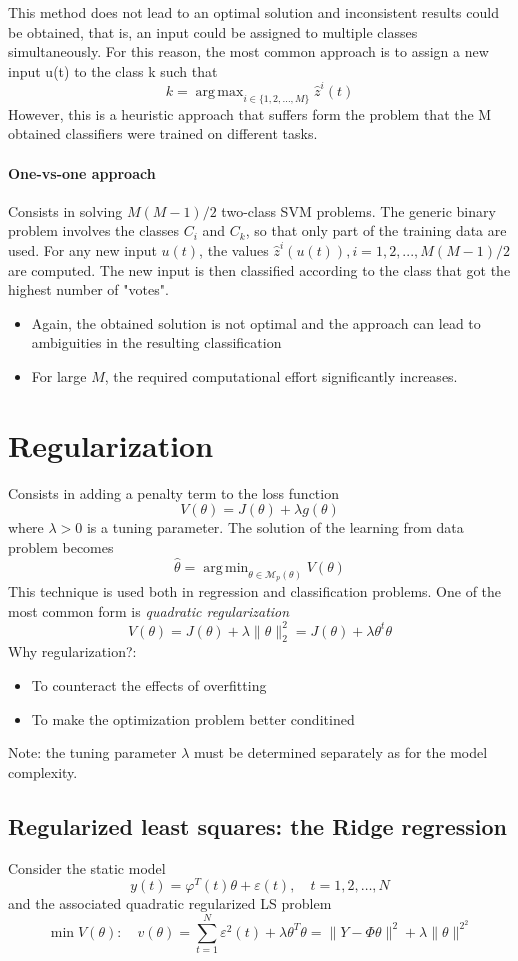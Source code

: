 \documentclass{book}
\DeclareMathOperator*{\argmax}{arg\,max}
\DeclareMathOperator*{\argmin}{arg\,min}
\begin{document}
This method does not lead to an optimal solution and inconsistent results could be obtained, that is, an input could be assigned to multiple classes simultaneously. For this reason, the most common approach is to assign a new input u(t) to the class k such that 
\[
  k=\argmax_{i\in\{1,2,\dots,M\}}\hat{z}^i(t)
\]
However, this is a heuristic approach that suffers form the problem that the M obtained classifiers were trained on different tasks.
\subsubsection{One-vs-one approach}
Consists in solving $M(M - 1)/2$ two-class SVM problems.
The generic binary problem involves the classes $C_i$ and $C_k$, so that only part of the training data are used.
For any new input $u(t)$, the values $\hat{z}^i(u(t)), i = 1,2,...,M(M - 1)/2$ are computed.
The new input is then classified according to the class that got the highest number of "votes".
\begin{itemize}
  \item Again, the obtained solution is not optimal and the approach can lead to ambiguities in the resulting classification
  \item For large $M$, the required computational effort significantly increases.
\end{itemize}

\chapter{Regularization}
Consists in adding a penalty term to the loss function 
\[
  V(\theta)=J(\theta)+\lambda g(\theta)
\]
where $\lambda>0$ is a tuning parameter. The solution of the learning from data problem becomes 
\[
  \hat{\theta}=\argmin_{\theta\in\mathcal{M}_p(\theta)}V(\theta)
\]
This technique is used both in regression and classification problems. One of the most common form is \emph{quadratic regularization}
\[
  V(\theta)=J(\theta)+\lambda\|\theta\|_2^2=J(\theta)+\lambda\theta^t\theta
\]
Why regularization?: 
\begin{itemize}
  \item To counteract the effects of overfitting 
  \item To make the optimization problem better conditined
\end{itemize}
Note: the tuning parameter $\lambda$ must be determined separately as for the model complexity.
\section{Regularized least squares: the Ridge regression}
Consider the static model 
\[
  y(t)=\varphi^T(t)\theta+\varepsilon(t),\quad t=1,2,\dots,N
\]
and the associated quadratic regularized LS problem 
\[
  \min V(\theta): \quad v(\theta)=\displaystyle\sum_{t=1}^{N}\varepsilon^2(t)+\lambda\theta^T\theta=\|Y-\Phi\theta\|^2+\lambda\|\theta\|^2^2
\]
\end{document}

